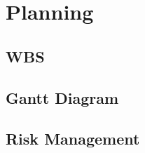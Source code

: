 % 
\chapter{Planning} %

%
\section{WBS} 
\label{sec:chap1_introduction} %

\section{Gantt Diagram}

\section{Risk Management}
